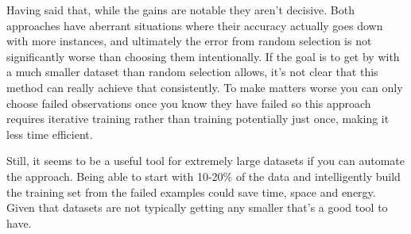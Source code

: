 \documentclass[11pt, letterpaper]{report}
\begin{document}
Having said that, while the gains are notable they aren't decisive. Both approaches have aberrant situations where their accuracy actually goes down with more instances, and ultimately the error from random selection is not significantly worse than choosing them intentionally. If the goal is to get by with a much smaller dataset than random selection allows, it's not clear that this method can really achieve that consistently. To make matters worse you can only choose failed observations once you know they have failed so this approach requires iterative training rather than training potentially just once, making it less time efficient.

Still, it seems to be a useful tool for extremely large datasets if you can automate the approach. Being able to start with 10-20\% of the data and intelligently build the training set from the failed examples could save time, space and energy. Given that datasets are not typically getting any smaller that's a good tool to have.
\end{document}
